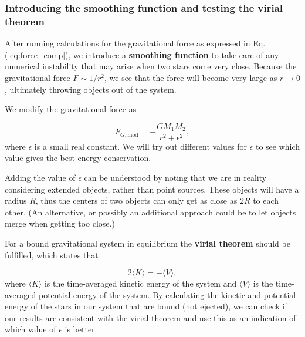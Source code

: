 \documentclass{article}
\begin{document}
\begin{multicols}{2}
\subsubsection{Introducing the smoothing function and testing the virial theorem}

After running calculations for the gravitational force as expressed in Eq. (\ref{eq:force_comp}), we introduce a \textbf{smoothing function} to take care of any numerical instability that may arise when two stars come very close. Because the gravitational force $F \sim 1/r^2$, we see that the force will become very large as $r \rightarrow 0$, ultimately throwing objects out of the system. 

We modify the gravitational force as

\begin{equation}\label{eq:force_mod}
	F_{G,\mathrm{mod}} = - \frac{G M_1 M_2}{r^2 + \epsilon^2},
\end{equation}
where $\epsilon$ is a small real constant. We will try out different values for $\epsilon$ to see which value gives the best energy conservation.

Adding the value of $\epsilon$ can be understood by noting that we are in reality considering extended objects, rather than point sources. These objects will have a radius $R$, thus the centers of two objects can only get as close as $2R$ to each other. (An alternative, or possibly an additional approach could be to let objects merge when getting too close.) 

For a bound gravitational system in equilibrium the \textbf{virial theorem} should be fulfilled, which states that

\begin{equation}\label{eq:vir}
	2 \langle K \rangle = - \langle V \rangle,
\end{equation}
where $\langle K \rangle$ is the time-averaged kinetic energy of the system and $\langle V \rangle$ is the time-averaged potential energy of the system. By calculating the kinetic and potential energy of the stars in our system that are bound (not ejected), we can check if our results are consistent with the virial theorem and use this as an indication of which value of $\epsilon$ is better.


\end{multicols}
\end{document}
